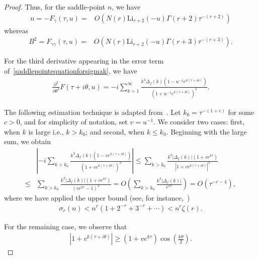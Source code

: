 \documentclass[12pt, oneside,reqno]{amsart}
\numberwithin{equation}{section}
\begin{document}
\begin{proof}

\medskip

Thus, for the saddle-point $n$, we have
\begin{align}\label{saddlepointsolutionforsigmak}
n=-F_{\gamma}(\tau,u)
=&O\left(N(r)\mathrm{Li}_{r+2}(-u)\Gamma(r+2)\tau^{-(r+2)}\right)
\end{align}
whereas
\begin{align*}
B^2=F_{\gamma\gamma}(\tau,u)
=&O\left(N(r)\mathrm{Li}_{r+2}(-u)\Gamma(r+3)\tau^{-(r+3)}\right).
\end{align*}

\noindent
For the third derivative appearing in the error term of~\eqref{saddlepointequationforsigmak}, we have
\begin{align*}
\frac{\partial^3}{\partial \theta^3}F(\tau+i\theta,u)
=-i\sum_{k=1}^{\infty}\frac{k^3\Delta_f(k)(1-u^{-1}e^{k(\tau+i\theta)})}{(1+u^{-1}e^{k(\tau+i\theta)})^3}.
\end{align*}

\noindent
The following estimation technique is adapted from~\cite{madwag}. Let $k_0=\tau^{-(1+c)}$ for some $c>0$, and for simplicity of notation, set $v=u^{-1}$. We consider two cases: first, when $k$ is large i.e., $k>k_0$; and second, when $k\leq k_0$. Beginning with the large sum, we obtain
\begin{align}\label{thirdorderderivative}
&\left|-i\sum_{k>k_0}\frac{k^3\Delta_f(k)(1-ve^{k(\tau+i\theta)})}{(1+ve^{k(\tau+i\theta)})^3}\right|
\leq\sum_{k>k_0}\frac{k^3|\Delta_f(k)|(1+ve^{k\tau})}{|1+ve^{k(\tau+i\theta)}|^3}\nonumber\\
\leq&\sum_{k>k_0}\frac{k^3|\Delta_f(k)|(1+ve^{k\tau})}{(ve^{k\tau}-1)^3}
=O\left(\sum_{k>k_0}\frac{k^3|\Delta_f(k)|}{e^{k\tau}}\right)
=O\left(\tau^{-r-4}\right),
\end{align}
where we have applied the upper bound (see, for instance,~\cite{ramanujan})
\begin{align*}
\sigma_r(n)
<n^r(1+2^{-r}+3^{-r}+\cdots)
<n^r\zeta(r).    
\end{align*}

\noindent
For the remaining case, we observe that
\begin{align*}
\left|1+v^{k(\tau+i\theta)}\right|
\geq (1+ve^{k\tau})\cos{\left(\frac{k\theta}{2}\right)}.
\end{align*}


\end{proof}
\end{document}
